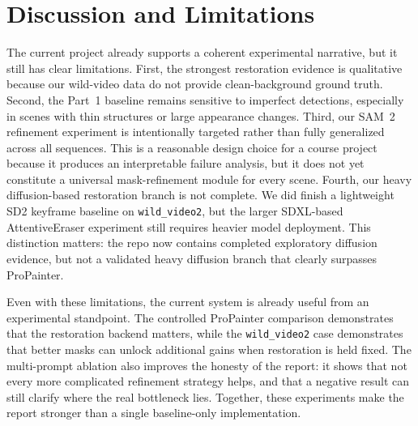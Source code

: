 \documentclass[10pt,twocolumn,letterpaper]{article}
\begin{document}
\section{Discussion and Limitations}
The current project already supports a coherent experimental narrative, but it still has clear limitations.
First, the strongest restoration evidence is qualitative because our wild-video data do not provide clean-background ground truth.
Second, the Part~1 baseline remains sensitive to imperfect detections, especially in scenes with thin structures or large appearance changes.
Third, our SAM~2 refinement experiment is intentionally targeted rather than fully generalized across all sequences.
This is a reasonable design choice for a course project because it produces an interpretable failure analysis, but it does not yet constitute a universal mask-refinement module for every scene.
Fourth, our heavy diffusion-based restoration branch is not complete.
We did finish a lightweight SD2 keyframe baseline on \texttt{wild\_video2}, but the larger SDXL-based AttentiveEraser experiment still requires heavier model deployment.
This distinction matters: the repo now contains completed exploratory diffusion evidence, but not a validated heavy diffusion branch that clearly surpasses ProPainter.

Even with these limitations, the current system is already useful from an experimental standpoint.
The controlled ProPainter comparison demonstrates that the restoration backend matters, while the \texttt{wild\_video2} case demonstrates that better masks can unlock additional gains when restoration is held fixed.
The multi-prompt ablation also improves the honesty of the report: it shows that not every more complicated refinement strategy helps, and that a negative result can still clarify where the real bottleneck lies.
Together, these experiments make the report stronger than a single baseline-only implementation.
\end{document}
